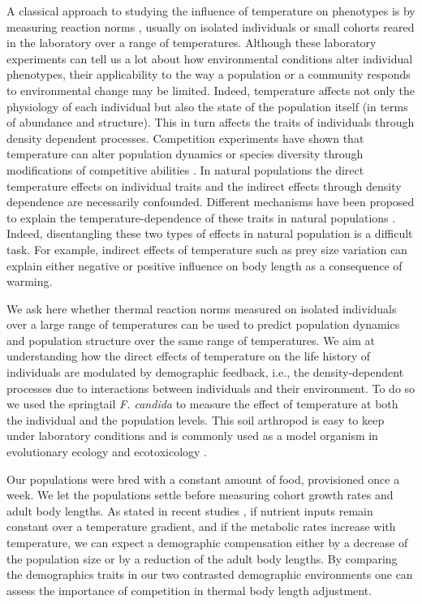 A classical approach to studying the influence of temperature on phenotypes is
by measuring reaction norms \autocites{woltereck1909a}, usually on isolated
individuals \autocites{driessen2007a,ellers2011b} or small cohorts
\autocites{liefting2009a,karan1998a} reared in the laboratory over a range of
temperatures. Although these laboratory experiments can tell us a lot about how
environmental conditions alter individual phenotypes, their applicability to the
way a population or a community responds to environmental change may be limited.
Indeed, temperature affects not only the physiology of each individual but also
the state of the population itself (in terms of abundance and structure). This
in turn affects the traits of individuals through density dependent processes.
Competition experiments have shown that temperature can alter population
dynamics or species diversity through modifications of competitive abilities
\autocites{park1954a,tilman1981competition}. In natural populations the direct
temperature effects on individual traits and the indirect effects through
density dependence are necessarily confounded. Different mechanisms have been
proposed to explain the temperature-dependence of these traits in natural
populations \autocites{sheridan2011a}.
Indeed, disentangling these two types of effects in natural population is a
difficult task.  For example, indirect effects of temperature such as prey size
variation can explain either negative \autocites{husby2011testing} or positive
\autocites{yom2008recent} influence on body length as a
consequence of warming.

We ask here whether thermal reaction norms measured on isolated individuals over
a large range of temperatures can be used to predict population dynamics
and population structure over the same range of temperatures. We aim at
understanding how the direct effects of temperature on the life history of
individuals are modulated by demographic feedback, i.e., the density-dependent
processes due to interactions between individuals and their environment. To do
so we used the springtail \textit{F. candida} to measure the effect of
temperature at both the individual and the population levels. This soil arthropod is easy to
keep under laboratory conditions and is commonly used as a model organism in
evolutionary ecology and ecotoxicology
\autocites{fountain2005a,tully2005a,tully2008a,tully2011a}.

Our populations were bred with a constant amount of food, provisioned once a
week. We let the populations settle before measuring cohort growth rates and
adult body lengths. As stated in recent studies
\autocites{sheridan2011a,reuman2014metabolic}, if nutrient inputs remain
constant over a temperature gradient, and if the metabolic rates increase with
temperature, we can expect a demographic compensation either by a decrease of
the population size or by a reduction of the adult body lengths. By comparing
the demographics traits in our two contrasted demographic environments one can
assess the importance of competition in thermal body length adjustment.

